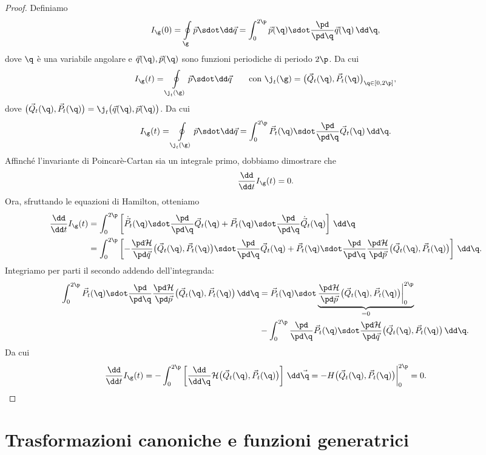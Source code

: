 \begin{proof}
	Definiamo
	\[
		I_\g(0) = \oint\limits_\g \vec{p}\sdot\dd\vec{q} = \int_0^{2\p}\vec{p}(\q) \sdot \frac{\pd}{\pd\q}\vec{q}(\q)\,\dd \q,
	\]
	dove \(\q\) è una variabile angolare e \(\vec{q}(\q),\vec{p}(\q)\) sono funzioni periodiche di periodo \(2\p\). Da cui
	\[
		I_\g(t) = \oint\limits_{\j_t(\g)}\vec{p} \sdot \dd\vec{q} \qquad\text{con }\j_t(\g) = {\big(\vec{Q}_t(\q),\vec{P}_t(\q)\big)}_{\q\in[0,2\p]},
	\]
	dove \(\big(\vec{Q}_t(\q),\vec{P}_t(\q)\big)=\j_t\big(\vec{q}(\q),\vec{p}(\q)\big)\). Da cui
	\[
		I_\g(t) = \oint\limits_{\j_t(\g)}\vec{p} \sdot \dd\vec{q} = \int_0^{2\p}\vec{P}_t(\q) \sdot \frac{\pd}{\pd\q}\vec{Q}_t(\q)\,\dd\q.
	\]
	Affinché l'invariante di Poincarè-Cartan sia un integrale primo, dobbiamo dimostrare che
	\[
		\frac{\dd}{\dd t}I_\g(t) = 0.
	\]
	Ora, sfruttando le equazioni di Hamilton, otteniamo
	\[
		\begin{split}
			\frac{\dd}{\dd t}I_\g(t) & = \int_0^{2\p}\left[\dot{\vec{P}}_t(\q) \sdot \frac{\pd}{\pd\q}\vec{Q}_t(\q)+\vec{P}_t(\q) \sdot \frac{\pd}{\pd\q}\dot{\vec{Q}}_t(\q)\right]\,\dd \q\\
			& = \int_0^{2\p} \left[-\frac{\pd\mathcal{H}}{\pd\vec{q}}\big(\vec{Q}_t(\q),\vec{P}_t(\q)\big) \sdot \frac{\pd}{\pd\q}\vec{Q}_t(\q)+\vec{P}_t(\q) \sdot \frac{\pd}{\pd\q}\frac{\pd\mathcal{H}}{\pd\vec{p}}\big(\vec{Q}_t(\q),\vec{P}_t(\q)\big)\right]\,\dd \q.
		\end{split}
	\]
	Integriamo per parti il secondo addendo dell'integranda:
	\[
		\begin{split}
			\int_0^{2\p} \vec{P}_t(\q) \sdot \frac{\pd}{\pd\q}\frac{\pd\mathcal{H}}{\pd\vec{p}}\big(\vec{Q}_t(\q),\vec{P}_t(\q)\big)\,\dd \q & = \vec{P}_t(\q) \sdot \underbrace{\frac{\pd\mathcal{H}}{\pd\vec{p}}\big(\vec{Q}_t(\q),\vec{P}_t(\q)\big) \bigg|_0^{2\p}}_{=0}\\
			& - \int_0^{2\p} \frac{\pd}{\pd\q}\vec{P}_t(\q) \sdot \frac{\pd\mathcal{H}}{\pd\vec{q}}\big(\vec{Q}_t(\q),\vec{P}_t(\q)\big)\,\dd \q.
		\end{split}
	\]
	Da cui
	\[
		\frac{\dd}{\dd t}I_\g(t) = -\int_0^{2\p}\left[\frac{\dd}{\dd\q}\mathcal{H}\big(\vec{Q}_t(\q),\vec{P}_t(\q)\big)\right]\,\dd \vec{\q} = -H\big(\vec{Q}_t(\q),\vec{P}_t(\q)\big)\bigg|_0^{2\p} = 0.\qedhere
	\]
\end{proof}
%
%
\section{Trasformazioni canoniche e funzioni generatrici}

